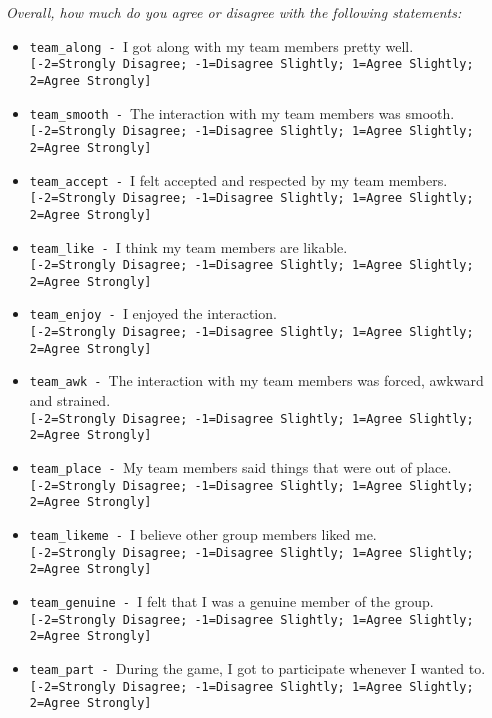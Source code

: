 \begin{description}
\begin{addmargin}[0em]{0em}
\begin{addmargin}[1em]{0em}
        \begin{addmargin}[1em]{0em}
            \textit{Overall, how much do you agree or disagree with the following statements:}
        \end{addmargin}
        \begin{itemize}
            \item \verb|team_along - |I got along with my team members pretty well.\\\verb|[-2=Strongly Disagree; -1=Disagree Slightly; 1=Agree Slightly; 2=Agree Strongly]|
            \item \verb|team_smooth - |The interaction with my team members was smooth.\\\verb|[-2=Strongly Disagree; -1=Disagree Slightly; 1=Agree Slightly; 2=Agree Strongly]|
            \item \verb|team_accept - |I felt accepted and respected by my team members.\\\verb|[-2=Strongly Disagree; -1=Disagree Slightly; 1=Agree Slightly; 2=Agree Strongly]|
            \item \verb|team_like - |I think my team members are likable.\\\verb|[-2=Strongly Disagree; -1=Disagree Slightly; 1=Agree Slightly; 2=Agree Strongly]|
            \item \verb|team_enjoy - |I enjoyed the interaction.\\\verb|[-2=Strongly Disagree; -1=Disagree Slightly; 1=Agree Slightly; 2=Agree Strongly]|
            \item \verb|team_awk - |The interaction with my team members was forced, awkward and strained.\\\verb|[-2=Strongly Disagree; -1=Disagree Slightly; 1=Agree Slightly; 2=Agree Strongly]|
            \item \verb|team_place - |My team members said things that were out of place.\\\verb|[-2=Strongly Disagree; -1=Disagree Slightly; 1=Agree Slightly; 2=Agree Strongly]|
            \item \verb|team_likeme - |I believe other group members liked me.\\\verb|[-2=Strongly Disagree; -1=Disagree Slightly; 1=Agree Slightly; 2=Agree Strongly]|
            \item \verb|team_genuine - |I felt that I was a genuine member of the group.\\\verb|[-2=Strongly Disagree; -1=Disagree Slightly; 1=Agree Slightly; 2=Agree Strongly]|
            \item \verb|team_part - |During the game, I got to participate whenever I wanted to.\\\verb|[-2=Strongly Disagree; -1=Disagree Slightly; 1=Agree Slightly; 2=Agree Strongly]|

\end{itemize}
\end{addmargin}
\end{addmargin}
\end{description}
